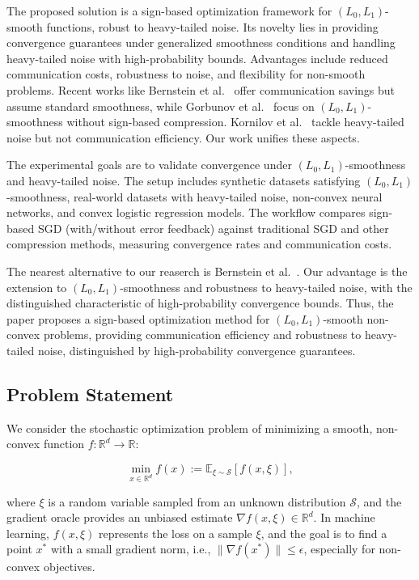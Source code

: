 The proposed solution is a sign-based optimization framework for $(L_0, L_1)$-smooth functions, robust to heavy-tailed noise. Its novelty lies in providing convergence guarantees under generalized smoothness conditions and handling heavy-tailed noise with high-probability bounds. Advantages include reduced communication costs, robustness to noise, and flexibility for non-smooth problems. Recent works like Bernstein et al.~\cite{pmlr-v80-bernstein18a} offer communication savings but assume standard smoothness, while Gorbunov et al.~\cite{gorbunov} focus on $(L_0, L_1)$-smoothness without sign-based compression. Kornilov et al.~\cite{Kornilov2025} tackle heavy-tailed noise but not communication efficiency. Our work unifies these aspects.

The experimental goals are to validate convergence under $(L_0, L_1)$-smoothness and heavy-tailed noise. The setup includes synthetic datasets satisfying $(L_0, L_1)$-smoothness, real-world datasets with heavy-tailed noise, non-convex neural networks, and convex logistic regression models. The workflow compares sign-based SGD (with/without error feedback) against traditional SGD and other compression methods, measuring convergence rates and communication costs.

The nearest alternative to our reaserch is Bernstein et al.~\cite{pmlr-v80-bernstein18a}. Our advantage is the extension to $(L_0, L_1)$-smoothness and robustness to heavy-tailed noise, with the distinguished characteristic of high-probability convergence bounds. Thus, the paper proposes a sign-based optimization method for $(L_0, L_1)$-smooth non-convex problems, providing communication efficiency and robustness to heavy-tailed noise, distinguished by high-probability convergence guarantees.

\subsection*{Problem Statement}

We consider the stochastic optimization problem of minimizing a smooth, non-convex function $f: \mathbb{R}^d \to \mathbb{R}$:

\[
\min_{x \in \mathbb{R}^d} f(x) := \mathbb{E}_{\xi \sim \mathcal{S}} [f(x, \xi)],
\]

where $\xi$ is a random variable sampled from an unknown distribution $\mathcal{S}$, and the gradient oracle provides an unbiased estimate $\nabla f(x, \xi) \in \mathbb{R}^d$. In machine learning, $f(x, \xi)$ represents the loss on a sample $\xi$, and the goal is to find a point $x^*$ with a small gradient norm, i.e., $\|\nabla f(x^*)\| \leq \epsilon$, especially for non-convex objectives.

